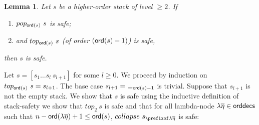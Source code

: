 \documentclass{article}
\newtheorem{lemma}{Lemma}[section]
\theoremstyle{remark}
\theoremstyle{definition}
\newcommand\orddec{\sf orddec}
\begin{document}
\begin{lemma}
\label{lem:cons_qsafety} Let $s$ be a higher-order stack of level $\geq 2$. If
\begin{enumerate}[1.]
\item $pop_{{\sf ord}(s)}~s$ is safe;
\item and $top_{{\sf ord}(s)}~s$ (of order $({\sf ord}(s)-1)$) is safe,
\end{enumerate}
then $s$ is safe.
\end{lemma}
\proof
Let $s = [s_1 \ldots s_l~s_{l+1}]$ for some $l\geq0$.
We proceed by induction on  $top_{{\sf ord}(s)}~s=s_{l+1}$.
The base case $s_{l+1} = \bot_{{\sf ord}(s)-1}$ is trivial.
Suppose that $s_{l+1}$ is not the empty stack. We show that $s$ is safe using the inductive definition of stack-safety \ie we show that $top_2~s$ is safe and that for all lambda-node $\lambda \overline{\eta} \in \orddec{s}$ such that $n-{\sf ord}(\lambda \overline{\eta})+1 \leq {\sf ord}(s)$, $collapse~s_{\prefixof \lambda \overline{\eta}}$ is safe:
\end{document}
